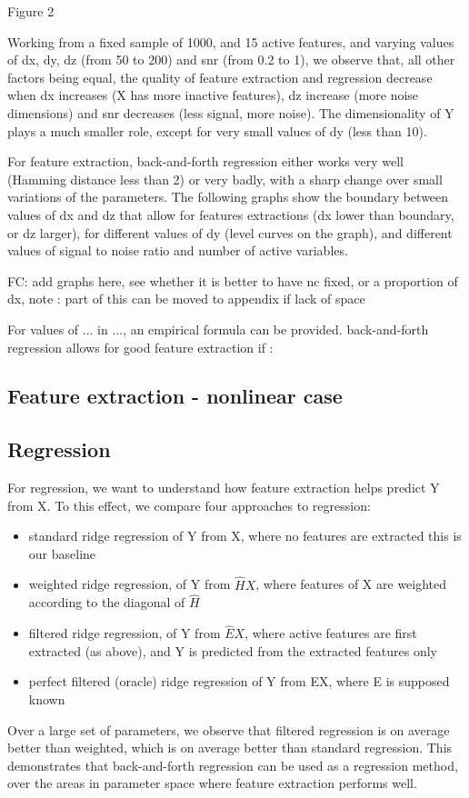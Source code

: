 \documentclass{article}
\begin{document}
Figure 2

Working from a fixed sample of 1000, and 15 active features, and varying values of dx, dy, dz (from 50 to 200) and snr (from 0.2 to 1), we observe that, all other factors being equal, the quality of feature extraction and regression decrease when dx increases (X has more inactive features), dz increase (more noise dimensions) and snr decreases (less signal, more noise).
%
The dimensionality of Y plays a much smaller role, except for very small values of dy (less than 10).

For feature extraction, back-and-forth regression either works very well (Hamming distance less than 2) or very badly, with a sharp change over small variations of the parameters.
%
The following graphs show the boundary between values of dx and dz that allow for features extractions (dx lower than boundary, or dz larger), for different values of dy (level curves on the graph), and different values of signal to noise ratio and number of active variables.

FC: add graphs here, see whether it is better to have nc fixed, or a proportion of dx, note : part of this can be moved to appendix if lack of space

For values of ...
%
in ..., an empirical formula can be provided.
%
back-and-forth regression allows for good feature extraction if :

\subsection{Feature extraction - nonlinear case}


\subsection{Regression }
For regression, we want to understand how feature extraction helps predict Y from X.
%
To this effect, we compare four approaches to regression:
\begin{itemize}
\item standard ridge regression of Y from X, where no features are extracted this is our baseline
\item weighted ridge regression, of Y from $\hat H X$, where features of X are weighted according to the diagonal of $\hat H$
\item filtered ridge regression, of Y from $\hat E X$, where active features are first extracted (as above), and Y is predicted from the extracted features only
\item perfect filtered (oracle) ridge regression of Y from EX, where E is supposed known
\end{itemize}
Over a large set of parameters, we observe that filtered regression is on average better than weighted, which is on average better than standard regression.
%
This demonstrates that back-and-forth regression can be used as a regression method, over the areas in parameter space where feature extraction performs well.
\end{document}

